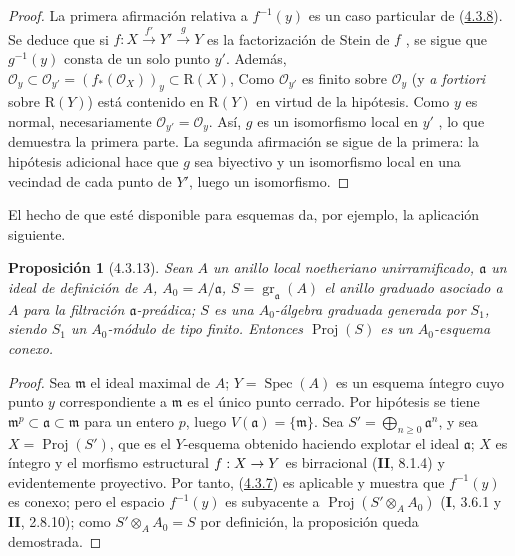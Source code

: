 \documentclass[10pt,oneside,openany]{book}
\theoremstyle{egaenv}\newtheorem*{env}{---}
\theoremstyle{egastatement}
\newtheorem*{proposition}{Proposición}
\theoremstyle{egadescription}
\newcommand{\oldpage}[2][]{\marginnote{\normalfont\scriptsize\textbf{#1}\,|\,#2}\ignorespaces}
\renewcommand{\geq}{\geqslant}
\renewcommand{\to}{\mathchoice{\longrightarrow}{\rightarrow}{\rightarrow}{\rightarrow}}
\begin{document}
\begin{proof}
La primera afirmación relativa a $f^{-1}(y)$ es un caso particular de (\hyperref[III.4.3.8-fr]{4.3.8}). Se
\oldpage[III]{135}
deduce que si $f:X\xrightarrow{f'}Y'\xrightarrow{g}Y$
es la factorización de Stein de $f$ , se sigue que
$g^{-1}(y)$ consta de un solo punto $y'$. Además,
$\mathcal O_y\subset\mathcal O_{y'}=(f_*(\mathcal O_X))_y
\subset\mathrm R(X)$,
Como $\mathcal O_{y'}$ es finito sobre $\mathcal O_y$ (y \emph{a fortiori} sobre $\mathrm R(Y)$) está contenido en $\mathrm R(Y)$ en virtud de la hipótesis. Como $y$ es normal, necesariamente
$\mathcal O_{y'}=\mathcal O_y$. Así, $g$ es un isomorfismo local en $y'$
, lo que demuestra la primera parte. La segunda
afirmación se sigue de la primera: la hipótesis adicional hace que $g$
sea biyectivo y un isomorfismo local en una vecindad de cada punto de
$Y'$, luego un isomorfismo.
\end{proof}

El hecho de que  esté disponible para esquemas da, por
ejemplo, la aplicación siguiente.

\begin{proposition}[4.3.13]
\label{III.4.3.13-fr}
Sean $A$ un anillo local noetheriano unirramificado, $\mathfrak a$ un ideal de
definición de $A$, $A_0=A/\mathfrak a$,
$S=\operatorname{gr}_{\mathfrak a}(A)$ el anillo graduado asociado a $A$ para
la filtración $\mathfrak a$-preádica; $S$ es una $A_0$-álgebra graduada
generada por $S_1$, siendo $S_1$ un $A_0$-módulo de tipo finito. Entonces
$\operatorname{Proj}(S)$ es un $A_0$-esquema conexo.
\end{proposition}

\begin{proof}
Sea $\mathfrak m$ el ideal maximal de $A$; $Y=\operatorname{Spec}(A)$ es
un esquema íntegro cuyo punto $y$ correspondiente a $\mathfrak m$ es
el único punto cerrado. Por hipótesis se tiene
$\mathfrak m^p\subset\mathfrak a\subset\mathfrak m$ para un entero $p$,
luego $V(\mathfrak a)=\{\mathfrak m\}$. Sea
$S'=\bigoplus_{n\geq0}\mathfrak a^n$, y sea
$X=\operatorname{Proj}(S')$, que es el $Y$-esquema obtenido haciendo explotar
el ideal $\mathfrak a$; $X$ es íntegro y el morfismo estructural
$f:X\to Y$ es birracional (\textbf{II}, 8.1.4) y evidentemente proyectivo. Por tanto,
(\hyperref[III.4.3.7-fr]{4.3.7}) es aplicable y muestra que $f^{-1}(y)$
es conexo; pero el espacio $f^{-1}(y)$ es subyacente a
$\operatorname{Proj}(S'\otimes_AA_0)$ (\textbf{I}, 3.6.1 y \textbf{II}, 2.8.10); como
$S'\otimes_AA_0=S$ por definición, la proposición queda demostrada.
\end{proof}
\end{document}
